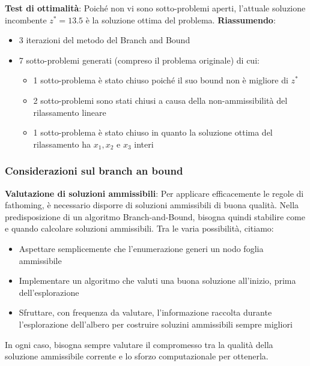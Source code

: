 \documentclass[12pt]{article}
\begin{document}
\textbf{Test di ottimalità}: Poiché non vi sono sotto-problemi aperti, l'attuale soluzione incombente $z^* = 13.5$ è la soluzione ottima del problema. \newline
\textbf{Riassumendo}:
\begin{itemize}
    \item 3 iterazioni del metodo del Branch and Bound 
    \item 7 sotto-problemi generati (compreso il problema originale) di cui:
    \begin{itemize}
        \item 1 sotto-problema è stato chiuso poiché il suo bound non è migliore di $z^*$
        \item 2 sotto-problemi sono stati chiusi a causa della non-ammissibilità del rilassamento lineare
        \item 1 sotto-problema è stato chiuso in quanto la soluzione ottima del rilassamento ha $x_1,x_2$ e $x_3$ interi
    \end{itemize}
\end{itemize}
\subsubsection{Considerazioni sul branch an bound}
\textbf{Valutazione di soluzioni ammissibili}:
Per applicare efficacemente le regole di fathoming, è necessario disporre di soluzioni ammissibili di buona qualità.
Nella predisposizione di un algoritmo Branch-and-Bound, bisogna quindi stabilire come e quando calcolare soluzioni ammissibili.
Tra le varia possibilità, citiamo:
\begin{itemize}
    \item Aspettare semplicemente che l'enumerazione generi un nodo foglia ammissibile
    \item Implementare un algoritmo che valuti una buona soluzione all'inizio, prima dell'esplorazione
    \item Sfruttare, con frequenza da valutare, l'informazione raccolta durante l'esplorazione dell'albero per costruire soluzini ammissibili sempre migliori
\end{itemize}
In ogni caso, bisogna sempre valutare il compromesso tra la qualità della soluzione ammissibile corrente e lo sforzo computazionale per ottenerla.
\end{document}
